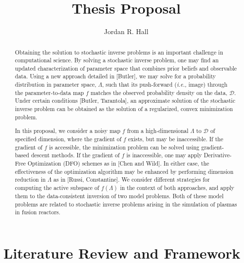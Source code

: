 \documentclass{amsart}
\begin{document}
\begin{abstract}

Obtaining the solution to stochastic inverse problems is an important challenge in computational science. By solving a stochastic inverse problem, one may find an updated  characterization of parameter space that combines  prior beliefs and observable data. Using a new approach detailed in [Butler], we may solve for a probability distribution in parameter space, $\Lambda$, such that its push-forward (\emph{i.e.,} image) through the parameter-to-data map $f$ matches the observed probability density on the data, $\mathcal{D}$. Under certain conditions [Butler, Tarantola], an approximate solution of the stochastic inverse problem can be obtained as the solution of a regularized, convex minimization problem.
  
In this proposal, we consider a noisy map $f$ from a high-dimensional $\Lambda$ to $\mathcal{D}$ of specified dimension, where the gradient of $f$ exists, but may be inaccessible. If the gradient of $f$ is accessible, the minimization problem can be solved using gradient-based descent methods. If the gradient of $f$ is inaccessible, one may apply Derivative-Free Optimization (DFO) schemes as in [Chen and Wild]. In either case,  the effectiveness of the optimization algorithm may be enhanced by performing dimension reduction in $\Lambda$ as in [Russi, Constantine]. We consider different strategies for computing the active subspace of $f(\Lambda)$ in the context of both approaches, and apply them to the data-consistent inversion of two model problems. Both of these model problems are related to stochastic inverse problems arising in the simulation of plasmas in fusion reactors.
 

\end{abstract}


\title{Thesis Proposal}

\author{Jordan R. Hall}

\maketitle



\tableofcontents

\setcounter{tocdepth}{0}




\newpage

\section{Literature Review and Framework}
\end{document}
